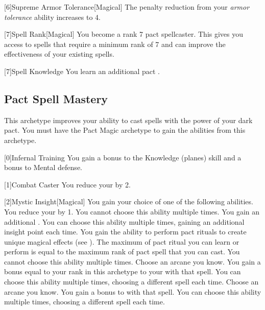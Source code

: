         [6]{Supreme Armor Tolerance}[Magical] The penalty reduction from your \textit{armor tolerance} ability increases to 4.

        [7]{Spell Rank}[Magical] You become a rank 7 pact spellcaster.
        This gives you access to spells that require a minimum rank of 7 and can improve the effectiveness of your existing spells.

        [7]{Spell Knowledge} You learn an additional pact .

    \newpage
    \subsection{Pact Spell Mastery}
        This archetype improves your ability to cast spells with the power of your dark pact.
        You must have the Pact Magic archetype to gain the abilities from this archetype.

        [0]{Infernal Training} You gain a  bonus to the Knowledge (planes) skill and a  bonus to Mental defense.

        [1]{Combat Caster} You reduce your  by 2.

        [2]{Mystic Insight}[Magical]
        You gain your choice of one of the following abilities.
        {
             You reduce your  by 1.
                You cannot choose this ability multiple times.
             You gain an additional .
                You can choose this ability multiple times, gaining an additional insight point each time.
             You gain the ability to perform pact rituals to create unique magical effects (see ).
                The maximum  of pact ritual you can learn or perform is equal to the maximum rank of pact spell that you can cast.
                You cannot choose this ability multiple times.
             Choose an arcane  you know.
                You gain a bonus equal to your rank in this archetype to your  with that spell.
                You can choose this ability multiple times, choosing a different spell each time.
             Choose an arcane  you know.
                You gain a  bonus to  with that spell.
                You can choose this ability multiple times, choosing a different spell each time.
        }


